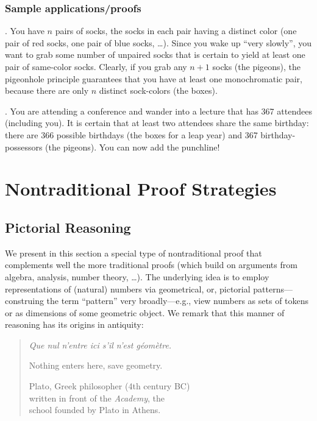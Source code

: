 \subsubsection{Sample applications/proofs}
\label{sec:pigeon-apps}

.
You have $n$ pairs of socks, the socks in each pair having a distinct color (one pair of red socks, one pair of blue socks, \ldots).  Since you wake up ``very slowly'', you want to grab some number of unpaired socks that is certain to yield at least one pair of same-color socks.  Clearly, if you grab any $n+1$ socks (the pigeons), the pigeonhole principle guarantees that you have at least one monochromatic pair, because there are only $n$ distinct sock-colors (the boxes).

\medskip

.
You are attending a conference and wander into a lecture that has 367 attendees (including you).  It is certain that at least two attendees share the same birthday: there are 366 possible birthdays (the boxes for a leap year) and 367 birthday-possessors (the pigeons).  You can now add the punchline!


\section{Nontraditional Proof Strategies}
\label{sec:nontraditionalProofs}

\subsection{Pictorial Reasoning}
\label{sec:graphicalproofs}

We present in this section a special type of nontraditional proof that complements well the more traditional proofs (which build on arguments from algebra, analysis, number theory, \ldots).  The underlying idea is to employ representations of (natural) numbers via geometrical, or, pictorial
patterns---construing the term ``pattern'' very broadly---e.g., view numbers as sets of tokens or as dimensions of some geometric object.  We remark that this manner of reasoning has its origins in antiquity:

\begin{quote}
{\it Que nul n'entre ici s'il n'est g\'eom\`etre.}

Nothing enters here, save geometry.

\hspace*{2in}Plato, Greek philosopher (4th century BC)\\
\hspace*{2in}written in front of the \textit{Academy}, the \\
\hspace*{2in}school founded by Plato in Athens. 
\end{quote}
\medskip

